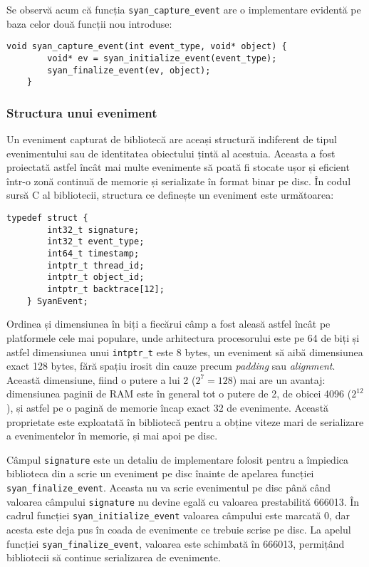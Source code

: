 Se observă acum că funcția \lstinline{syan_capture_event} are o
implementare evidentă pe baza celor două funcții nou introduse:
\begin{lstlisting}[caption=Implementarea funcției
                   \lstinline{syan_capture_event}]
    void syan_capture_event(int event_type, void* object) {
        void* ev = syan_initialize_event(event_type);
        syan_finalize_event(ev, object);
    }
\end{lstlisting}

\subsubsection{Structura unui eveniment}\label{section:event-structure}

Un eveniment capturat de bibliotecă are aceași structură indiferent de
tipul evenimentului sau de identitatea obiectului țintă al acestuia.
Aceasta a fost proiectată astfel încât mai multe evenimente să poată fi
stocate ușor și eficient într-o zonă continuă de memorie și serializate
în format binar pe disc. În codul sursă C al bibliotecii, structura ce
definește un eveniment este următoarea:
\begin{lstlisting}[caption=Structura unui eveniment capturat]
    typedef struct {
        int32_t signature;
        int32_t event_type;
        int64_t timestamp;
        intptr_t thread_id;
        intptr_t object_id;
        intptr_t backtrace[12];
    } SyanEvent;
\end{lstlisting}

Ordinea și dimensiunea în biți a fiecărui câmp a fost aleasă astfel
încât pe platformele cele mai populare, unde arhitectura procesorului
este pe 64 de biți și astfel dimensiunea unui \lstinline{intptr_t} este
8 bytes, un eveniment să aibă dimensiunea exact 128 bytes, fără spațiu
irosit din cauze precum \textit{padding} sau \textit{alignment}. Această
dimensiune, fiind o putere a lui 2 ($2^7=128$) mai are un avantaj:
dimensiunea paginii de RAM este în general tot o putere de 2, de obicei
4096 ($2^{12}$), și astfel pe o pagină de memorie încap exact 32 de
evenimente. Această proprietate este exploatată în bibliotecă pentru a
obține viteze mari de serializare a evenimentelor în memorie, și mai
apoi pe disc.

Câmpul \lstinline{signature} este un detaliu de implementare folosit
pentru a împiedica biblioteca din a scrie un eveniment pe disc înainte
de apelarea funcției \lstinline{syan_finalize_event}. Aceasta nu va
scrie evenimentul pe disc până când valoarea câmpului
\lstinline{signature} nu devine egală cu valoarea prestabilită 666013.
În cadrul funcției \lstinline{syan_initialize_event} valoarea câmpului
este marcată 0, dar acesta este deja pus în coada de evenimente ce
trebuie scrise pe disc. La apelul funcției
\lstinline{syan_finalize_event}, valoarea este schimbată în 666013,
permițând bibliotecii să continue serializarea de evenimente.


